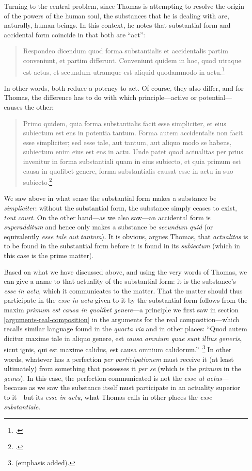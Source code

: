 Turning to the central problem, since Thomas is attempting to resolve the origin of the powers of the human soul, the substances that he is dealing with are, naturally, human beings. In this context, he notes that substantial form and accidental form coincide in that both are “act”:
%
\begin{quotation}
Respondeo dicendum quod forma substantialis et accidentalis partim conveniunt, et partim differunt. Conveniunt quidem in hoc, quod utraque est actus, et secundum utramque est aliquid quodammodo in actu.\footcite[I, q.~77, a.~6, co.]{st:summa}
\end{quotation}
%
In other words, both reduce a potency to act. Of course, they also differ, and for Thomas, the difference has to do with which principle—active or potential—causes the other:
%
\begin{quotation}
Primo quidem, quia forma substantialis facit esse simpliciter, et eius subiectum est ens in potentia tantum. Forma autem accidentalis non facit esse simpliciter; sed esse tale, aut tantum, aut aliquo modo se habens, subiectum enim eius est ens in actu. Unde patet quod actualitas per prius invenitur in forma substantiali quam in eius subiecto, et quia primum est causa in quolibet genere, forma substantialis causat esse in actu in suo subiecto.\footcite[I, q.~77, a.~6, co.]{st:summa}
\end{quotation}
%
We saw above in what sense the substantial form makes a substance be \emph{simpliciter}: without the substantial form, the substance simply ceases to exist, \emph{tout court}. On the other hand—as we also saw—an accidental form is \emph{superadditum} and hence  only makes a substance be \emph{secundum quid} (or equivalently \emph{esse tale aut tantum}). It is obvious, argues Thomas, that \emph{actualitas} is to be found in the substantial form before it is found in its \emph{subiectum} (which in this case is the prime matter).

Based on what we have discussed above, and using the very words of Thomas, we can give a name to that actuality of the substantial form: it is the substance’s \emph{esse in actu}, which it communicates to the matter. That the matter should thus participate in the \emph{esse in actu} given to it by the substantial form follows from the maxim \emph{primum est causa in quolibet genere}—a principle we first saw in section \ref{arguments-real-composition} in the arguments for the real composition—which recalls similar language found in the \emph{quarta via} and in other places: “Quod autem dicitur maxime tale in aliquo genere, est \emph{causa omnium quae sunt illius generis}, sicut ignis, qui est maxime calidus, est causa omnium calidorum.”\,%
%
\footnote{\Cite[I, q.~2, a.~3]{st:summa} (emphasis added).}
%
In other words, whatever has a perfection \emph{per participationem} must receive it (at least ultimately) from something that possesses it \emph{per se} (which is the \emph{primum} in the \emph{genus}). In this case, the perfection communicated is not the \emph{esse ut actus}—because as we saw the substance itself must participate in an actuality superior to it—but its \emph{esse in actu}, what Thomas calls in other places the \emph{esse substantiale}.

